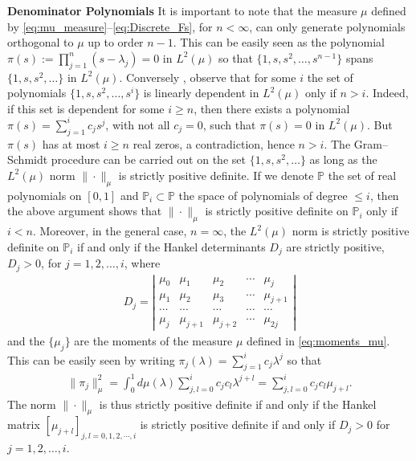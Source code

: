 \documentclass[english,12pt]{ttuthes}
\begin{document}
\noindent\textbf{Denominator Polynomials}\newline
%
It is important to note that the measure $\mu$ defined by
\eqref{eq:mu_measure}--\eqref{eq:Discrete_Fs}, for $n<\infty$, can only
generate polynomials orthogonal to $\mu$ up to order  
$n-1$. This can be easily seen \cite{Deift:2000:RMT} as the polynomial 
$\pi(s):=\prod_{j=1}^n(s-\lambda_j)=0$ in $L^2(\mu)$ so that $\{1,s,s^2,\ldots,s^{n-1}\}$ spans
$\{1,s,s^2,\ldots\}$ in $L^2(\mu)$. Conversely \cite{Deift:2000:RMT}, observe
that for some $i$ the set of polynomials $\{1,s,s^2,\ldots,s^i\}$ is linearly
dependent in $L^2(\mu)$ only if $n>i$. Indeed, if this set is dependent
for some $i\geq n$, then there  exists a polynomial
$\pi(s)=\sum_{j=1}^ic_js^j$, with not all $c_j=0$, such that $\pi(s)=0$ in
$L^2(\mu)$. But $\pi(s)$ has at most $i\geq n$ real zeros, a contradiction,
hence $n>i$. The Gram--Schmidt procedure can be carried out on the set
$\{1,s,s^2,\ldots\}$ as long as the $L^2(\mu)$ norm $\|\cdot\|_\mu$ is strictly
positive definite. If we denote $\mathbb{P}$ the set of real
polynomials on $[0,1]$ and $\mathbb{P}_i\subset\mathbb{P}$ the space of
polynomials of degree $\leq i$, then the above argument shows that
$\|\cdot\|_\mu$ is strictly positive definite on $\mathbb{P}_i$ only if 
$i<n.$  Moreover, in the general case, $n=\infty$, the $L^2(\mu)$ norm is
strictly positive definite on $\mathbb{P}_i$ if and only if the Hankel
determinants $D_j$ are strictly positive, $D_j>0$, for $j=1,2,\ldots,i$,
where   
%
\begin{align}\label{eq:Hankel_Det}
 D_j=
  \left|
    \begin{matrix}
      \mu_0   & \mu_1 & \mu_2   & \cdots & \mu_j  \\
      \mu_1   & \mu_2 & \mu_3   & \cdots & \mu_{j+1}\\
      \cdots     & \cdots   & \cdots     & \cdots & \cdots    \\
      \mu_j & \mu_{j+1} & \mu_{j+2} & \cdots & \mu_{2j}
    \end{matrix}
  \right|  
\end{align}
%
and the $\{\mu_j\}$ are the moments of the measure $\mu$ defined
in \eqref{eq:moments_mu}. This can be easily seen
\cite{Gautschi:2004:OP} by writing $\pi_j(\lambda)=\sum_{j=1}^ic_j\lambda^j$ so that  
%
\begin{align}
  \|\pi_j\|_\mu^2=\int_0^1d\mu(\lambda)\sum_{j,l=0}^ic_jc_l\lambda^{j+l}=\sum_{j,l=0}^ic_jc_l\mu_{j+l}.
\end{align}
%
The norm $\|\cdot\|_\mu$ is thus strictly positive definite if and only if 
the Hankel matrix $[\mu_{j+l}]_{j,l=0,1,2,\cdots,i}$ is strictly positive definite
if and only if $D_j>0$ for $j=1,2,\ldots,i$.
\end{document}
